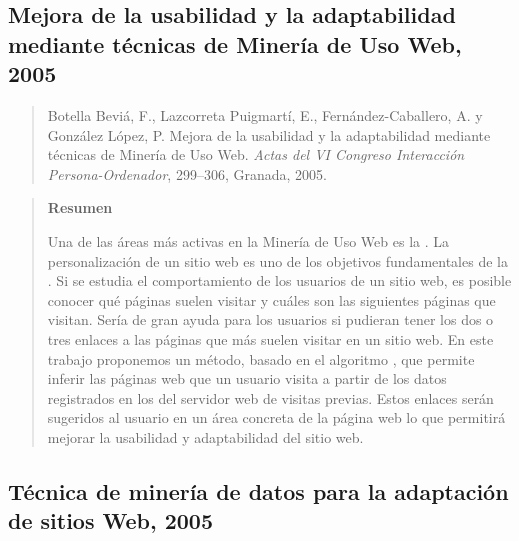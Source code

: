\subsection*{Mejora de la usabilidad y la adaptabilidad mediante técnicas de Minería de Uso Web, 2005}
\label{sec:nuestro-Mejora-2005}

\begin{quote}
  Botella Beviá, F., Lazcorreta Puigmartí, E., Fernández-Caballero, A. y González López, P. Mejora de la usabilidad y la adaptabilidad mediante técnicas de Minería de Uso Web. \emph{Actas del VI Congreso Interacción Persona-Ordenador}, 299--306, Granada, 2005.  
\end{quote}

\begin{quote}
	\textbf{Resumen}

	\nopagebreak Una de las áreas más activas en la Minería de Uso Web es la \prediccion. La personalización de un sitio web es uno de los objetivos fundamentales de la \prediccion. Si se estudia el comportamiento de los usuarios de un sitio web, es posible conocer qué páginas suelen visitar y cuáles son las siguientes páginas que visitan. Sería de gran ayuda para los usuarios si pudieran tener los dos o tres enlaces a las páginas que más suelen visitar en un sitio web. En este trabajo proponemos un método, basado en el algoritmo \apriori, que permite inferir las páginas web que un usuario visita a partir de los datos registrados en los \flogs del servidor web de visitas previas. Estos enlaces serán sugeridos al usuario en un área concreta de la página web lo que permitirá mejorar la usabilidad y adaptabilidad del sitio web.
\end{quote}





\subsection*{Técnica de minería de datos para la adaptación de sitios Web, 2005}
\label{sec:nuestro-Tecnica-2005}

